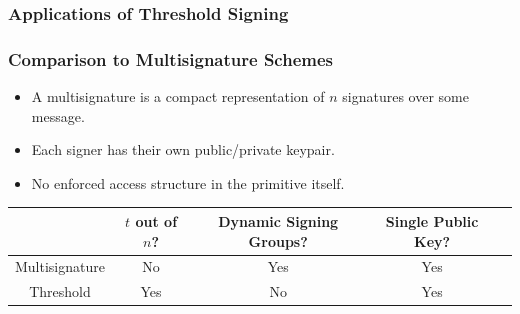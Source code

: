 \documentclass[hyperref={pdfpagelabels=true},table,dvipsnames,14pt,aspectratio=169]{beamer}
\begin{document}
\begin{frame}
  \frametitle{Applications of Threshold Signing}
  \begin{itemize}
  \end{itemize}
\end{frame}

\begin{frame}
  \frametitle{Comparison to Multisignature Schemes}
  \centering

  \begin{itemize}
    \item<1->  A multisignature is a compact representation of $n$ signatures
      over some message.
    \item<2-> Each signer has their own public/private keypair.
    \item<3-> No enforced access structure in the primitive itself.
  \end{itemize}

   {\begin{table}[t]
    \centering
    \footnotesize
    \begin{tabular}{c|c|c|c|c }
      & \textbf{$t$ out of $n$?} & \textbf{Dynamic Signing Groups?} &
      \textbf{Single Public Key?} \\
      \hline
      Multisignature & No & Yes& Yes   \\
      Threshold & Yes & No & Yes  \\
    \end{tabular}
  \end{table} }
\end{frame}
\end{document}
